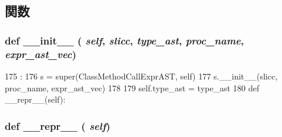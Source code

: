 \subsection{関数}
\hypertarget{classslicc_1_1ast_1_1MethodCallExprAST_1_1ClassMethodCallExprAST_ac775ee34451fdfa742b318538164070e}{
\subsubsection[{\_\-\_\-init\_\-\_\-}]{\setlength{\rightskip}{0pt plus 5cm}def \_\-\_\-init\_\-\_\- ( {\em self}, \/   {\em slicc}, \/   {\em type\_\-ast}, \/   {\em proc\_\-name}, \/   {\em expr\_\-ast\_\-vec})}}
\label{classslicc_1_1ast_1_1MethodCallExprAST_1_1ClassMethodCallExprAST_ac775ee34451fdfa742b318538164070e}



\begin{DoxyCode}
175                                                                 :
176         s = super(ClassMethodCallExprAST, self)
177         s.__init__(slicc, proc_name, expr_ast_vec)
178 
179         self.type_ast = type_ast
180 
    def __repr__(self):
\end{DoxyCode}
\hypertarget{classslicc_1_1ast_1_1MethodCallExprAST_1_1ClassMethodCallExprAST_ad8b9328939df072e4740cd9a63189744}{
\subsubsection[{\_\-\_\-repr\_\-\_\-}]{\setlength{\rightskip}{0pt plus 5cm}def \_\-\_\-repr\_\-\_\- ( {\em self})}}
\label{classslicc_1_1ast_1_1MethodCallExprAST_1_1ClassMethodCallExprAST_ad8b9328939df072e4740cd9a63189744}



